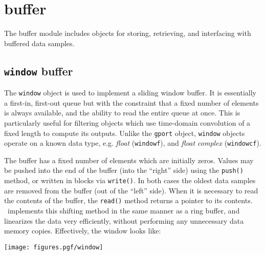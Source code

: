 % 
%

\newpage
\section{buffer}
\label{module:buffer}
The buffer module includes objects for storing, retrieving, and
interfacing with buffered data samples.


\subsection{{\tt window} buffer}
\label{module:buffer:window}
The {\tt window} object is used to implement a sliding window buffer.
It is essentially a first-in, first-out queue but with the constraint that a
fixed number of elements is always available, and the ability to read the
entire queue at once.
This is particularly useful for filtering objects which use time-domain
convolution of a fixed length to compute its outputs.
Unlike the {\tt gport} object, {\tt window} objects operate on a known data
type, e.g.
{\it float} ({\tt windowf}), and
{\it float complex} ({\tt windowcf}).

The buffer has a fixed number of elements which are initially zeros.
Values may be pushed into the end of the buffer (into the ``right'' side)
using the {\tt push()} method, or written in blocks via {\tt write()}.
In both cases the oldest data samples are removed from the buffer (out of the
``left'' side).
When it is necessary to read the contents of the buffer, the {\tt read()}
method returns a pointer to its contents.
\liquid\ implements this shifting method in the same manner as a ring buffer,
and linearizes the data very efficiently, without performing any unnecessary
data memory copies.
Effectively, the window looks like:

\begin{centering}
\texttt{[image: figures.pgf/window]}
\end{centering}

